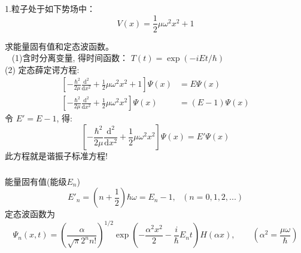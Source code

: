 \begin{frame}
	\frametitle{}
	\begin{exampleblock} {1.粒子处于如下势场中：}
	  \begin{equation*}
		  V(x)= \frac{1}{2} \mu \omega ^2 x^2  +1
	  \end{equation*}
	\end{exampleblock}
	  \hspace{2em}求能量固有值和定态波函数。\\	
	  \解 ~ (1)含时分离变量, 得时间函数： $T(t)  = \exp(-i E t /\hbar) $ \\
	  (2) 定态薛定谔方程:
	  \begin{equation*}
		  \begin{split}
			  \left [ -\frac{\hbar^2}{2\mu} \frac{\mathrm{d} ^2}{\mathrm{d} x^2} +\frac{1}{2}\mu \omega^2 x^2 +1 \right ]\Psi(x)&=E\Psi(x) \\ 
			  \left [ -\frac{\hbar^2}{2\mu} \frac{\mathrm{d} ^2}{\mathrm{d} x^2} +\frac{1}{2}\mu \omega^2 x^2  \right ]\Psi(x)&=(E-1)\Psi(x) 	
		  \end{split}
	  \end{equation*}
	  令 $E'=E-1$, 得:
	  \[\left [ -\frac{\hbar^2}{2\mu} \frac{\mathrm{d} ^2}{\mathrm{d} x^2} +\frac{1}{2}\mu \omega^2 x^2  \right ]\Psi(x)=E'\Psi(x) \]
	  此方程就是谐振子标准方程!
\end{frame}

\begin{frame}
		\frametitle{}	  
	  能量固有值(能级$E_n$)
	  \begin{equation*}
		  E'_n=\left(n+\frac{1}{2}\right) \hbar \omega=E_n-1, ~~~  ( n=0,1,2, ...)  
	  \end{equation*}  
	  定态波函数为
	  \begin{equation*}
		  \Psi_n(x,t) = \left( \frac{\alpha}{\sqrt{\pi} 2^n n!}  \right) ^{1/2}  \exp(-\frac{ \alpha^2 x^2}{2} -\frac{i}{\hbar} E_n t ) H( \alpha x) , \qquad (\alpha ^2= \frac{\mu\omega}{\hbar}) 
	  \end{equation*}  
\end{frame}